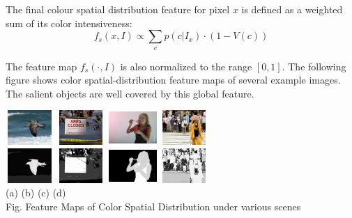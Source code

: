 \documentclass[10pt,twocolumn,letterpaper]{article}
\newcommand{\SUM}{\sum\limits}
\newcommand{\hs}{\hspace{0.58in}}
\begin{document}
    The final colour spatial distribution feature for pixel $x$ is defined as a weighted sum of its color intensiveness:
    $$
    f_s(x,I)\propto\SUM_c p(c|I_x)\cdot(1-V(c))
    $$

    The feature map $f_s (\cdot,I)$ is also normalized to the range $[0, 1]$. The following figure
    shows color spatial-distribution feature maps of several example images. 
    The salient objects are well covered by this global feature. 

    \begin{center}
    \includegraphics[width=0.72in,height=0.52in]{./CSD_image/1.jpg}
    \includegraphics[width=0.72in,height=0.52in]{./CSD_image/2.jpg}
    \includegraphics[width=0.72in,height=0.52in]{./CSD_image/3.jpg}
    \includegraphics[width=0.72in,height=0.52in]{./CSD_image/4.jpg}\\
    \includegraphics[width=0.72in,height=0.52in]{./CSD_image/1_CSD.jpg}
    \includegraphics[width=0.72in,height=0.52in]{./CSD_image/2_CSD.jpg}
    \includegraphics[width=0.72in,height=0.52in]{./CSD_image/3_CSD.jpg} 
    \includegraphics[width=0.72in,height=0.52in]{./CSD_image/4_CSD.jpg} \\
    \footnotesize \hspace{0.1cm} (a) \hs (b) \hs  (c) \hs (d) \\
     Fig. Feature Maps of Color Spatial Distribution under various scenes
    \end{center}
\end{document}
